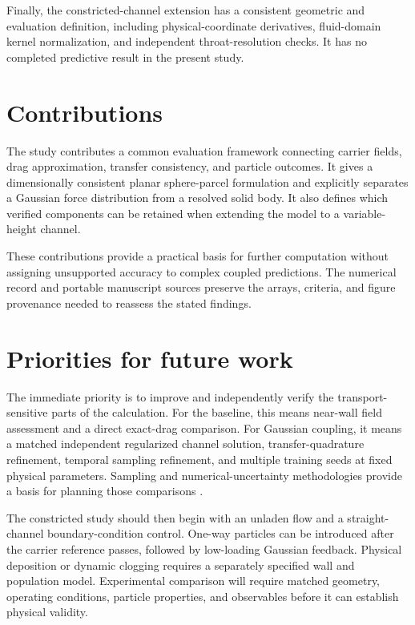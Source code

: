 Finally, the constricted-channel extension has a consistent geometric and
evaluation definition, including physical-coordinate derivatives,
fluid-domain kernel normalization, and independent throat-resolution
checks. It has no completed predictive result in the present study.

\section{Contributions}
The study contributes a common evaluation framework connecting carrier
fields, drag approximation, transfer consistency, and particle outcomes.
It gives a dimensionally consistent planar sphere-parcel formulation and
explicitly separates a Gaussian force distribution from a resolved solid
body. It also defines which verified components can be retained when
extending the model to a variable-height channel.

These contributions provide a practical basis for further computation
without assigning unsupported accuracy to complex coupled predictions.
The numerical record and portable manuscript sources preserve the arrays,
criteria, and figure provenance needed to reassess the stated findings.

\section{Priorities for future work}
The immediate priority is to improve and independently verify the
transport-sensitive parts of the calculation. For the baseline, this
means near-wall field assessment and a direct exact-drag comparison. For
Gaussian coupling, it means a matched independent regularized channel
solution, transfer-quadrature refinement, temporal sampling refinement,
and multiple training seeds at fixed physical parameters. Sampling and
numerical-uncertainty methodologies provide a basis for planning those
comparisons \citep{wu2023,celik2008,oberkampf2002}. %

The constricted study should then begin with an unladen flow and a
straight-channel boundary-condition control. One-way particles can be
introduced after the carrier reference passes, followed by low-loading
Gaussian feedback. Physical deposition or dynamic clogging requires a
separately specified wall and population model. Experimental comparison
will require matched geometry, operating conditions, particle properties,
and observables before it can establish physical validity.

